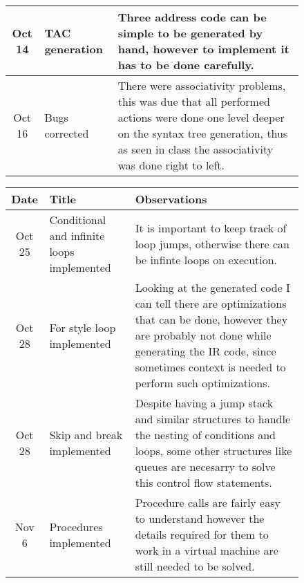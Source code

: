 \begin{figure}[H]
\begin{tabular}{cp{1.25in}p{2.5in}}
        \midrule
        Oct 14 & TAC generation &
        Three address code can be simple to be generated by hand, however to
        implement it has to be done carefully.\\

        \midrule
        Oct 16 & Bugs corrected &
        There were associativity problems, this was due that all performed
        actions were done one level deeper on the syntax tree generation, thus
        as seen in class the associativity was done right to left.\\

        \bottomrule
    \end{tabular}
\end{figure}

\begin{figure}[H]
    \centering
    \begin{tabular}{cp{1.25in}p{2.5in}}
        \toprule
        \textbf{Date} & \textbf{Title} & \textbf{Observations}\\
        \midrule
        Oct 25 & Conditional and \newline infinite loops \newline implemented &
        It is important to keep track of loop jumps, otherwise there can be
        infinte loops on execution.\\

        \midrule
        Oct 28 & For style loop \newline implemented &
        Looking at the generated code I can tell there are optimizations that
        can be done, however they are probably not done while generating the
        IR code, since sometimes context is needed to perform such
        \newline optimizations.\\

        \midrule
        Oct 28 & Skip and break \newline implemented &
        Despite having a jump stack and similar structures to handle the
        nesting of conditions and loops, some other structures like queues are
        necesarry to solve this control flow statements.\\

        \midrule
        Nov  6 & Procedures \newline implemented &
        Procedure calls are fairly easy to understand however the details
        required for them to work in a virtual machine are still needed to be
        solved.\\


\end{tabular}
\end{figure}

